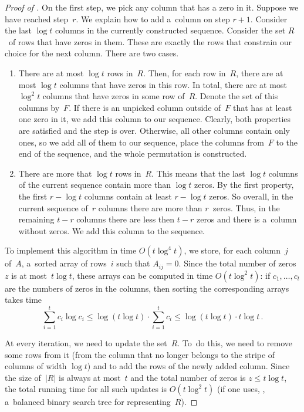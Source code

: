 \documentclass{toc}
\begin{document}
\begin{proof}[Proof of {}]
    On the first step, we pick any column that has a zero in it. Suppose
    we have reached step~$r$. We explain how to add a~column on
    step $r+1$. Consider the last $\log t$ columns in the currently
    constructed sequence. Consider the set $R$~of rows that have
    zeros in them. These are exactly the rows that constrain our
    choice for the next column. There are two cases.
    \begin{enumerate}
        \item There are at most $\log t$ rows in~$R$. Then, for each row in~$R$, there
        are at most $\log t$ columns that have zeros in this row. In total, there are at
        most $\log^2 t$ columns that have zeros in some row of~$R$. Denote the set of
        this columns by~$F$. If there is an unpicked column outside of~$F$ that has at
        least one zero in it, we add this column to our sequence. Clearly, both
        properties are satisfied and the step is over. Otherwise, all other columns
        contain only ones, so we add all of them to our sequence, place the columns
        from~$F$ to the end of the sequence, and the whole permutation is constructed.
        \item There are more that $\log t$ rows in~$R$. This means that the last
        $\log t$ columns of the current sequence contain more than $\log t$ zeros. By
        the first property, the first $r - \log t$ columns contain at least $r - \log t$
        zeros. So overall, in the current sequence of~$r$ columns there are more than
        $r$~zeros. Thus, in the remaining $t-r$ columns there are less then $t-r$ zeros
        and there is a~column without zeros. We add this column to the sequence.
    \end{enumerate}


    To implement this algorithm in time $O(t\log^{4}t)$, we store, for each
    column~$j$ of~$A$, a~sorted array of rows~$i$ such that $A_{ij}=0$. Since the
    total number of zeros~$z$ is at most~$t\log t$, these arrays can be computed in
    time $O(t\log^2t)$: if $c_1, \dotsc, c_t$ are the numbers of zeros in the
    columns, then sorting the corresponding arrays takes time
    \[\sum_{i=1}^{t}c_i \log c_i \le \log(t \log t) \cdot \sum_{i=1}^{t}c_i \le \log(t \log t) \cdot t\log t \, .\]

    At every iteration, we need to update the set~$R$. To~do this, we need to remove
    some rows from it (from the column that no longer belongs to the stripe of
    columns of width $\log t$) and to add the rows of the newly added column. Since
    the size of~$|R|$ is always at most~$t$ and the total number of zeros is
    $z \le t\log t$, the total running time for all such updates is
    $O(t\log^2t)$ (if one uses, \eg, a~balanced binary search tree for
    representing~$R$).


\end{proof}
\end{document}
